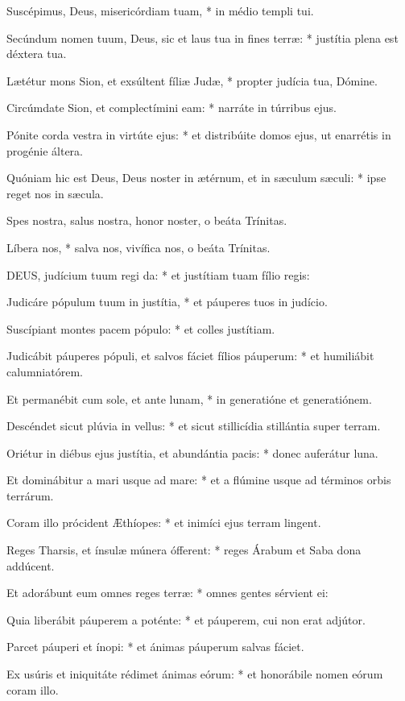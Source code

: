 Suscépimus, Deus, misericórdiam tuam, * in médio templi tui.

Secúndum nomen tuum, Deus, sic et laus tua in fines terræ: * justítia plena est déxtera tua.

Lætétur mons Sion, et exsúltent fíliæ Judæ, * propter judícia tua, Dómine.

Circúmdate Sion, et complectímini eam: * narráte in túrribus ejus.

Pónite corda vestra in virtúte ejus: * et distribúite domos ejus, ut enarrétis in progénie áltera.

Quóniam hic est Deus, Deus noster in ætérnum, et in sæculum sæculi: * ipse reget nos in sæcula.

 Spes nostra, salus nostra, honor noster, o beáta Trínitas.

 Líbera nos, * salva nos, vivífica nos, o beáta Trínitas.


\lettrine[lines=2]{D}{EUS}, judícium tuum regi da: * et justítiam tuam fílio regis:

Judicáre pópulum tuum in justítia, * et páuperes tuos in judício.

Suscípiant montes pacem pópulo: * et colles justítiam.

Judicábit páuperes pópuli, et salvos fáciet fílios páuperum: * et humiliábit calumniatórem.

Et permanébit cum sole, et ante lunam, * in generatióne et generatiónem.

Descéndet sicut plúvia in vellus: * et sicut stillicídia stillántia super terram.

Oriétur in diébus ejus justítia, et abundántia pacis: * donec auferátur luna.

Et dominábitur a mari usque ad mare: * et a flúmine usque ad términos orbis terrárum.

Coram illo prócident Æthíopes: * et inimíci ejus terram lingent.

Reges Tharsis, et ínsulæ múnera ófferent: * reges Árabum et Saba dona addúcent.

Et adorábunt eum omnes reges terræ: * omnes gentes sérvient ei:

Quia liberábit páuperem a poténte: * et páuperem, cui non erat adjútor.

Parcet páuperi et ínopi: * et ánimas páuperum salvas fáciet.

Ex usúris et iniquitáte rédimet ánimas eórum: * et honorábile nomen eórum coram illo.

